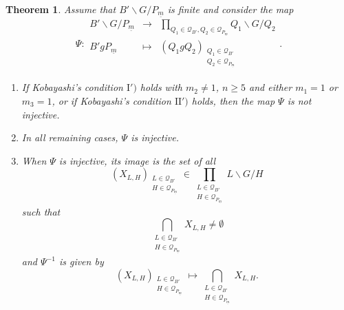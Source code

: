 \documentclass[pdftex]{sigma}
\numberwithin{equation}{section}
\theoremstyle{definition}
\theoremstyle{plain}
\theoremstyle{plain}
\theoremstyle{plain}
\newtheorem{theoremx}{Theorem}
\theoremstyle{plain}
\begin{document}
\begin{theoremx}\label{Theorem A}
	Assume that $B'\backslash G/P_{\underline m}$ is finite and consider the map
	\begin{equation*}
		\Psi : \begin{array}{ccc}
		B' \backslash G/P_{\underline m} & \to & \displaystyle \prod_{Q_1 \in \mathcal Q_{B'}, Q_2 \in \mathcal Q_{P_{\underline m}}} Q_1 \backslash G/Q_2 \\
		B'gP_{\underline m} & \mapsto & (Q_1gQ_2)_{\substack{Q_1 \in \mathcal Q_{B'} \\ Q_2 \in \mathcal Q_{P_{\underline m}}}}
	\end{array}.
	\end{equation*}
	\begin{enumerate}[label = $\roman*)$]
		\item If Kobayashi's condition $\mathrm{I}')$ holds with $m_2 \neq 1$, $n \geqslant 5$ and either $m_1 = 1$ or $m_3 = 1$, or if Kobayashi's condition $\mathrm{II}')$ holds, then the map $\Psi$ is not injective.
		\item In all remaining cases, $\Psi$ is injective.
		\item When $\Psi$ is injective, its image is the set of all
		\begin{equation*}
			(X_{L,H})_{\substack{L \in \mathcal Q_{B'} \\ H \in \mathcal Q_{P_{\underline m}}}} \in \displaystyle \prod_{\substack{L \in \mathcal Q_{B'} \\ H \in \mathcal Q_{P_{\underline m}}}} L\backslash G/H
		\end{equation*}
		such that
		\begin{equation*}
			\bigcap_{\substack{L \in \mathcal Q_{B'} \\ H \in \mathcal Q_{P_{\underline m}}}} X_{L,H} \neq \emptyset
		\end{equation*}
		and $\Psi^{-1}$ is given by
		\begin{equation*}
			(X_{L,H})_{\substack{L \in \mathcal Q_{B'} \\ H \in \mathcal Q_{P_{\underline m}}}} \mapsto \bigcap_{\substack{L \in \mathcal Q_{B'} \\ H \in \mathcal Q_{P_{\underline m}}}} X_{L,H}.
		\end{equation*}
	\end{enumerate}
\end{theoremx}
\end{document}
